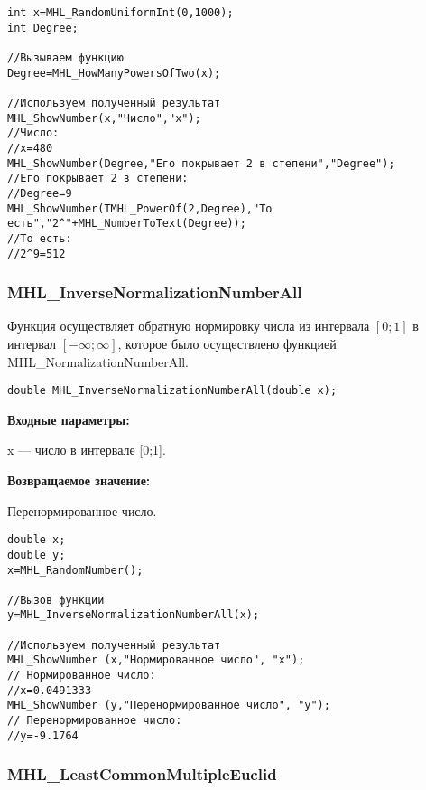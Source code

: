 \documentclass[a4paper,12pt]{article}
\begin{document}
\begin{lstlisting}[label=code_use_MHL_HowManyPowersOfTwo,caption=Пример использования]
int x=MHL_RandomUniformInt(0,1000);
int Degree;

//Вызываем функцию
Degree=MHL_HowManyPowersOfTwo(x);

//Используем полученный результат
MHL_ShowNumber(x,"Число","x");
//Число:
//x=480
MHL_ShowNumber(Degree,"Его покрывает 2 в степени","Degree");
//Его покрывает 2 в степени:
//Degree=9
MHL_ShowNumber(TMHL_PowerOf(2,Degree),"То есть","2^"+MHL_NumberToText(Degree));
//То есть:
//2^9=512
\end{lstlisting}

\subsubsection{MHL\_InverseNormalizationNumberAll}\label{MHL_InverseNormalizationNumberAll}

Функция осуществляет обратную нормировку числа из интервала $\left[0;1\right] $  в интервал $\left[-\infty;\infty \right] $, которое было осуществлено функцией MHL\_NormalizationNumberAll.


\begin{lstlisting}[label=code_syntax_MHL_InverseNormalizationNumberAll,caption=Синтаксис]
double MHL_InverseNormalizationNumberAll(double x);
\end{lstlisting}

\textbf{Входные параметры:}

 x --- число в интервале [0;1].

\textbf{Возвращаемое значение:}
 
Перенормированное число.


\begin{lstlisting}[label=code_use_MHL_InverseNormalizationNumberAll,caption=Пример использования]
double x;
double y;
x=MHL_RandomNumber();

//Вызов функции
y=MHL_InverseNormalizationNumberAll(x);

//Используем полученный результат
MHL_ShowNumber (x,"Нормированное число", "x");
// Нормированное число:
//x=0.0491333
MHL_ShowNumber (y,"Перенормированное число", "y");
// Перенормированное число:
//y=-9.1764
\end{lstlisting}

\subsubsection{MHL\_LeastCommonMultipleEuclid}\label{MHL_LeastCommonMultipleEuclid}
\end{document}
